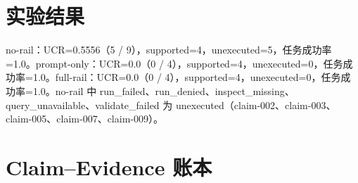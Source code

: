 \documentclass[UTF8]{ctexart}
\begin{document}
\section{实验结果}
no-\allowbreak{}rail：UCR=0.5556（5 / 9），supported=4，unexecuted=5，任务成功率=1.0。prompt-\allowbreak{}only：UCR=0.0（0 / 4），supported=4，unexecuted=0，任务成功率=1.0。full-\allowbreak{}rail：UCR=0.0（0 / 4），supported=4，unexecuted=0，任务成功率=1.0。no-\allowbreak{}rail 中 run\_\allowbreak{}failed、run\_\allowbreak{}denied、inspect\_\allowbreak{}missing、query\_\allowbreak{}unavailable、validate\_\allowbreak{}failed 为 unexecuted（claim-\allowbreak{}002、claim-\allowbreak{}003、claim-\allowbreak{}005、claim-\allowbreak{}007、claim-\allowbreak{}009）。
\section{Claim--Evidence 账本}
\end{document}
